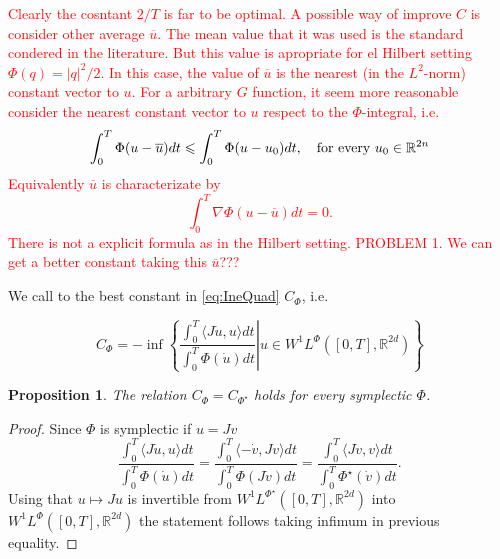 \documentclass[twoside]{article}
\newtheorem{prop}[thm]{Proposition}
\theoremstyle{remark}
\newcommand{\rr}{\mathbb{R}}
\renewcommand{\leq}{\leqslant}
\newcommand{\Phie}{\Phi^{\star}}
\begin{document}
\textcolor{red}{ Clearly the cosntant $2/T$ is far to be optimal. A possible way of improve $C$ is consider other average $\overline{u}$. The mean value that it was used is the standard condered in the literature. But this value is apropriate for el Hilbert setting $\Phi(q)=|q|^2/2$. In this case, the value of $\overline{u}$ is the nearest (in the $L^2$-norm) constant vector to $u$. For a arbitrary $G$ function, it seem more reasonable consider    the nearest constant vector to $u$ respect to the $\Phi $-integral, i.e.
\[
 \int_0^T\Phi(u-\overline{u})dt\leq \int_0^T\Phi(u-u_0)dt,\quad\hbox{for every } u_0\in\rr^{2n}
\]
Equivalently $\overline{u}$ is characterizate by
\[
 \int_0^T\nabla\Phi(u-\overline{u})dt=0.
\]
There is not a explicit formula as in the Hilbert setting.
\newline
PROBLEM 1. We can get a better constant taking this $\overline{u}$???}

 We call to the best constant in \eqref{eq:IneQuad} $C_{\Phi}$, i.e.
 
\begin{equation}\label{eq:C-optima}
C_{\Phi}=-\inf\left\{\left.\frac{\int_0^T\langle J\dot{u},u\rangle dt}{\int_0^T\Phi(\dot{u})dt}\right|
u\in W^1L^{\Phi}\left([0,T],\rr^{2d}\right)\right\}
 \end{equation}
 
 
\begin{prop} The relation $C_{\Phi}=C_{\Phie}$ holds for every symplectic $\Phi$. 
 \end{prop}
 
 \begin{proof} Since $\Phi$ is symplectic if $u=Jv$
 \[
      \frac{\int_0^T\langle J\dot{u},u\rangle dt}{\int_0^T\Phi(\dot{u})dt}
      =
      \frac{\int_0^T\langle -\dot{v},Jv\rangle dt}{\int_0^T\Phi(J\dot{v})dt}
      =\frac{\int_0^T\langle J\dot{v},v\rangle dt}{\int_0^T\Phie(\dot{v})dt}.
   \]
 Using that $u\mapsto Ju$ is invertible from $W^1L^{\Phie}([0,T],\rr^{2d})$ into $W^1L^{\Phi}([0,T],\rr^{2d})$ the statement follows taking infimum in previous equality.
  
 \end{proof}
\end{document}
